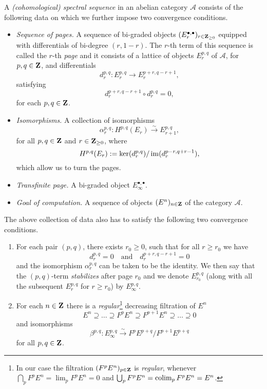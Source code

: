 \begin{definition}
    A \emph{(cohomological) spectral sequence} in an abelian category $\mathcal A$ consists of the following data on which we further impose two convergence conditions.
\begin{itemize}
    \item \emph{Sequence of pages.} 
    A sequence of bi-graded objects $(E^{\bullet, \bullet}_r)_{r \in \mathbf Z_{\geq 0}}$ equipped with differentials of bi-degree $(r, 1-r)$. The $r$-th term of this sequence is called the $r$-th \emph{page} and it consists of a lattice of objects $E^{p,q}_r$ of $\mathcal A$, for $p, q \in \mathbf Z$, and differentials
    \[
        d^{p,q}_r : E^{p,q}_r \to E^{p + r, q - r + 1}_r,
    \] 
    satisfying
    \[
        d^{p + r, q - r + 1}_r \circ d^{p,q}_r = 0,
    \]
    for each $p, q \in \mathbf Z$.
    \item \emph{Isomorphisms.} A collection of isomorphisms
    \[
        \alpha^{p,q}_r : H^{p,q}(E_r) \xrightarrow{\sim} E^{p,q}_{r + 1},
    \]
    for all $p, q \in \mathbf Z$ and $r \in \mathbf Z_{\geq 0}$, where 
    \[
        H^{p,q}(E_r) := \ker(d^{p,q}_r)/\operatorname{im}(d^{p-r, q + r - 1}_r),
    \]
    which allow us to turn the pages.
    \item \emph{Transfinite page.} A bi-graded object $E^{\bullet, \bullet}_\infty$. 
    \item \emph{Goal of computation.} A sequence of objects $(E^n)_{n \in \mathbf Z}$ of the category $\mathcal A$.
\end{itemize}
The above collection of data also has to satisfy the following two convergence conditions.
\begin{enumerate}[label = (\alph*)]
    \item For each pair $(p,q)$, there exists $r_0 \geq 0$, such that for all $r \geq r_0$ we have
    \[
        d^{p,q}_r = 0 \quad \text{and} \quad d^{p + r, q - r + 1}_r = 0
    \]
    and the isomorphism $\alpha^{p,q}_r$ can be taken to be the identity. We then say that the $(p,q)$-term \emph{stabilizes} after page $r_0$ and we denote $E^{p,q}_{r_0}$ (along with all the subsequent $E^{p,q}_{r}$ for $r \geq r_0$) by $E^{p,q}_\infty$.
    \item For each $n \in \mathbf Z$ there is a \emph{regular}\footnote{In our case the filtration $(F^p E^n)_{p \in \mathbf Z}$ is \emph{regular}, whenever $\bigcap_p F^p E^n = \lim_p F^p E^n = 0$ and $\bigcup_p F^p E^n = \operatorname{colim}_p F^p E^n = E^n$.} decreasing filtration of $E^n$
    \begin{equation}
        \label{eq: regular filtration}
        E^n \supseteq \dots \supseteq F^p E^n \supseteq F^{p + 1}E^n \supseteq \dots \supseteq 0
    \end{equation}
    and isomorphisms
    \[
        \beta^{p,q} : E^{p,q}_\infty \xrightarrow{\sim} F^p E^{p + q}/F^{p + 1}E^{p + q}
    \]
    for all $p, q \in \mathbf Z$.
\end{enumerate}


\end{definition}
